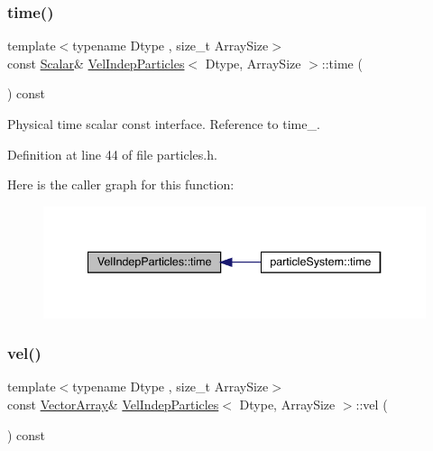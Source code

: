 \subsubsection{\texorpdfstring{time()}{time()}}
{\footnotesize\ttfamily template$<$typename Dtype , size\+\_\+t Array\+Size$>$ \\
const \mbox{\hyperlink{class_vel_indep_particles_a5d275b22f0d759f360ddd80e78f4b466}{Scalar}}\& \mbox{\hyperlink{class_vel_indep_particles}{Vel\+Indep\+Particles}}$<$ Dtype, Array\+Size $>$\+::time (\begin{DoxyParamCaption}{ }\end{DoxyParamCaption}) const\hspace{0.3cm}{\ttfamily [inline]}}



Physical time scalar const interface. Reference to time\+\_\+. 



Definition at line 44 of file particles.\+h.

Here is the caller graph for this function\+:\nopagebreak
\begin{figure}[H]
\begin{center}
\leavevmode
\includegraphics[width=340pt]{class_vel_indep_particles_a7c2968d7757eb6b3dc59259fadcf661c_icgraph}
\end{center}
\end{figure}
\mbox{\label{class_vel_indep_particles_a5774853214c5f32f34def508962a1267}} 
\subsubsection{\texorpdfstring{vel()}{vel()}\hspace{0.1cm}{\footnotesize\ttfamily [1/2]}}
{\footnotesize\ttfamily template$<$typename Dtype , size\+\_\+t Array\+Size$>$ \\
const \mbox{\hyperlink{class_vel_indep_particles_a27580f65b6523bfb6900520af2e44708}{Vector\+Array}}\& \mbox{\hyperlink{class_vel_indep_particles}{Vel\+Indep\+Particles}}$<$ Dtype, Array\+Size $>$\+::vel (\begin{DoxyParamCaption}{ }\end{DoxyParamCaption}) const\hspace{0.3cm}{\ttfamily [inline]}}



